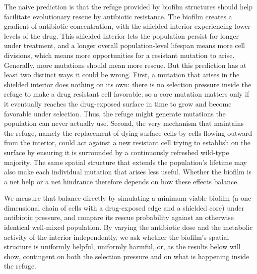The naive prediction is that the refuge provided by biofilm structures should help facilitate evolutionary rescue by antibiotic resistance. The biofilm creates a gradient of antibiotic concentration, with the shielded interior experiencing lower levels of the drug. This shielded interior lets the population persist for longer under treatment, and a longer overall population-level lifespan means more cell divisions, which means more opportunities for a resistant mutation to arise. Generally, more mutations should mean more rescue. But this prediction has at least two distinct ways it could be wrong. First, a mutation that arises in the shielded interior does nothing on its own: there is no selection pressure inside the refuge to make a drug resistant cell favorable, so a core mutation matters only if it eventually reaches the drug-exposed surface in time to grow and become favorable under selection. Thus, the refuge might generate mutations the population can never actually use. Second, the very mechanism that maintains the refuge, namely the replacement of dying surface cells by cells flowing outward from the interior, could act against a new resistant cell trying to establish on the surface by ensuring it is surrounded by a continuously refreshed wild-type majority. The same spatial structure that extends the population's lifetime may also make each individual mutation that arises less useful. Whether the biofilm is a net help or a net hindrance therefore depends on how these effects balance.

We measure that balance directly by simulating a minimum-viable biofilm (a one-dimensional chain of cells with a drug-exposed edge and a shielded core) under antibiotic pressure, and compare its rescue probability against an otherwise identical well-mixed population. By varying the antibiotic dose and the metabolic activity of the interior independently, we ask whether the biofilm's spatial structure is uniformly helpful, uniformly harmful, or, as the results below will show, contingent on both the selection pressure and on what is happening inside the refuge.
